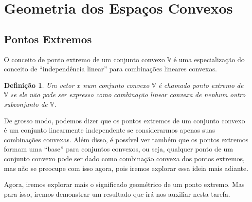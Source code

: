 \newtheorem{def:ponto extremo}[def:conjunto convexo]{Definição}

\newtheorem{def:raio}[def:conjunto convexo]{Definição}

\newtheorem{def:direção}[def:conjunto convexo]{Definição}

\newtheorem{def:direção extrema}[def:conjunto convexo]{Definição}

\newtheorem{def:ponto degenerado}[def:conjunto convexo]{Definição}


\newtheorem{prop:combinação convexa}{Proposição}[chapter]

\newtheorem{prop:hiperplano e ponto extremo}[prop:combinação convexa]{Proposição}


\newtheorem{thm:ponto extremo}{Teorema}[chapter]

\section{Geometria dos Espaços Convexos}

\subsection{Pontos Extremos}

O conceito de ponto extremo de um conjunto convexo $\mathbb{V}$ é uma especialização do conceito de ``independência linear'' para combinações lineares convexas.

\begin{def:ponto extremo}
	Um vetor $x$ num conjunto convexo $\mathbb{V}$ é chamado ponto extremo de $\mathbb{V}$ se ele não pode ser expresso como combinação linear convexa de nenhum outro subconjunto de $\mathbb{V}$. 
\end{def:ponto extremo}

De grosso modo, podemos dizer que os pontos extremos de um conjunto convexo é um conjunto linearmente independente se considerarmos apenas suas combinações convexas. Além disso, é possível ver também que os pontos extremos formam uma ``base'' para conjuntos convexos, ou seja, qualquer ponto de um conjunto convexo pode ser dado como combinação convexa dos pontos extremos, mas não se preocupe com isso agora, pois iremos explorar essa ideia mais adiante.

Agora, iremos explorar mais o significado geométrico de um ponto extremo. Mas para isso, iremos demonstrar um resultado que irá nos auxiliar nesta tarefa.

